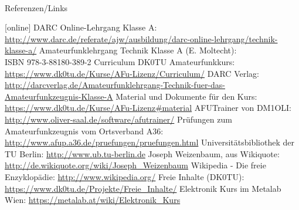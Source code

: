 \renewcommand{\refname}{Referenzen}

\hypertarget{refs}{}
\textcolor{white}{} \\ %
\Large Referenzen/Links
\footnotesize

\begin{thebibliography}{}
    [online]
      DARC Online-Lehrgang Klasse A:
                    \url{http://www.darc.de/referate/ajw/ausbildung/darc-online-lehrgang/technik-klasse-a/}
     Amateurfunklehrgang Technik Klasse A (E. Moltecht): \\
                    ISBN 978-3-88180-389-2
      Curriculum DK0TU Amateurfunkkurs: \\
                    \url{https://www.dk0tu.de/Kurse/AFu-Lizenz/Curriculum/}
     DARC Verlag:
                    \url{http://darcverlag.de/Amateurfunklehrgang-Technik-fuer-das-Amateurfunkzeugnis-Klasse-A}
       Material und Dokumente für den Kurs:
                    \url{https://www.dk0tu.de/Kurse/AFu-Lizenz#material}
      AFUTrainer von DM1OLI:
                    \url{http://www.oliver-saal.de/software/afutrainer/}
      Prüfungen zum Amateurfunkzeugnis vom Ortsverband A36:
                    \url{http://www.afup.a36.de/pruefungen/pruefungen.html}
        Universitätsbibliothek der TU Berlin:
                    \url{http://www.ub.tu-berlin.de}
     Joseph Weizenbaum, aus Wikiquote:
                    \url{http://de.wikiquote.org/wiki/Joseph_Weizenbaum}
        Wikipedia - Die freie Enzyklopädie:
                    \url{http://www.wikipedia.org/}
        Freie Inhalte (DK0TU):
                    \url{https://www.dk0tu.de/Projekte/Freie_Inhalte/}
      Elektronik Kurs im Metalab Wien:
                    \url{https://metalab.at/wiki/Elektronik_Kurs}
\end{thebibliography} 


